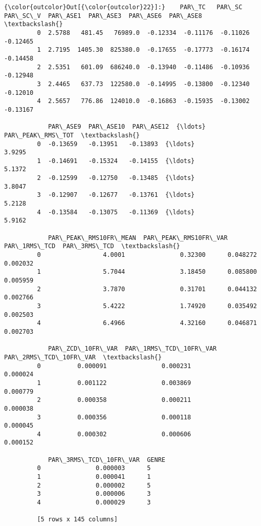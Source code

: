 \documentclass[11pt]{article}
\begin{document}
\begin{Verbatim}[commandchars=\\\{\}]
{\color{outcolor}Out[{\color{outcolor}22}]:}    PAR\_TC   PAR\_SC  PAR\_SC\_V  PAR\_ASE1  PAR\_ASE3  PAR\_ASE6  PAR\_ASE8  \textbackslash{}
         0  2.5788   481.45   76989.0  -0.12334  -0.11176  -0.11026  -0.12465   
         1  2.7195  1405.30  825380.0  -0.17655  -0.17773  -0.16174  -0.14458   
         2  2.5351   601.09  686240.0  -0.13940  -0.11486  -0.10936  -0.12948   
         3  2.4465   637.73  122580.0  -0.14995  -0.13800  -0.12340  -0.12010   
         4  2.5657   776.86  124010.0  -0.16863  -0.15935  -0.13002  -0.13167   
         
            PAR\_ASE9  PAR\_ASE10  PAR\_ASE12  {\ldots}    PAR\_PEAK\_RMS\_TOT  \textbackslash{}
         0  -0.13659   -0.13951   -0.13893  {\ldots}              3.9295   
         1  -0.14691   -0.15324   -0.14155  {\ldots}              5.1372   
         2  -0.12599   -0.12750   -0.13485  {\ldots}              3.8047   
         3  -0.12907   -0.12677   -0.13761  {\ldots}              5.2128   
         4  -0.13584   -0.13075   -0.11369  {\ldots}              5.9162   
         
            PAR\_PEAK\_RMS10FR\_MEAN  PAR\_PEAK\_RMS10FR\_VAR  PAR\_1RMS\_TCD  PAR\_3RMS\_TCD  \textbackslash{}
         0                 4.0001               0.32300      0.048272      0.002032   
         1                 5.7044               3.18450      0.085800      0.005959   
         2                 3.7870               0.31701      0.044132      0.002766   
         3                 5.4222               1.74920      0.035492      0.002503   
         4                 6.4966               4.32160      0.046871      0.002703   
         
            PAR\_ZCD\_10FR\_VAR  PAR\_1RMS\_TCD\_10FR\_VAR  PAR\_2RMS\_TCD\_10FR\_VAR  \textbackslash{}
         0          0.000091               0.000231               0.000024   
         1          0.001122               0.003869               0.000779   
         2          0.000358               0.000211               0.000038   
         3          0.000356               0.000118               0.000045   
         4          0.000302               0.000606               0.000152   
         
            PAR\_3RMS\_TCD\_10FR\_VAR  GENRE  
         0               0.000003      5  
         1               0.000041      1  
         2               0.000002      5  
         3               0.000006      3  
         4               0.000029      3  
         
         [5 rows x 145 columns]
\end{Verbatim}
            
\end{document}
